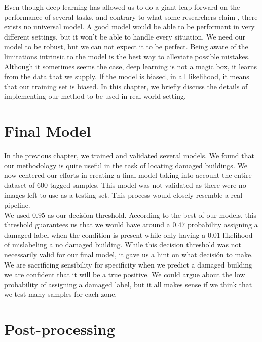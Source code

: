 Even though deep learning has allowed us to do a giant leap forward on the performance of several tasks, and contrary to what some researchers claim \cite{DBLP:journals/corr/KaiserGSVPJU17}, there exists no universal model. A good model would be able to be performant in very different settings, but it won't be able to handle every situation. We need our model to be robust, but we can not expect it to be perfect. Being aware of the limitations intrinsic to the model is the best way to alleviate possible mistakes. Although it sometimes seems the case, deep learning is not a magic box, it learns from the data that we supply. If the model is biased, in all likelihood, it means that our training set is biased. In this chapter, we briefly discuss the details of implementing our method to be used in real-world setting.\\

\section{Final Model}

In the previous chapter, we trained and validated several models. We found that our methodology is quite useful in the task of locating damaged buildings. We now centered our efforts in creating a final model taking into account the entire dataset of 600 tagged samples. This model was not validated as there were no images left to use as a testing set. This process would closely resemble a real pipeline.\\


We used $0.95$ as our decision threshold. According to the best of our models, this threshold guarantees us that we would have around a $0.47$ probability assigning a damaged label when the condition is present while only having a $0.01$ likelihood of mislabeling a no damaged building. While this decision threshold was not necessarily valid for our final model, it gave us a hint on what decisión to make. We are sacrificing sensibility for specificity when we predict a damaged building we are confident that it will be a true positive. We could argue about the low probability of assigning a damaged label, but it all makes sense if we think that we test many samples for each zone.\\


\section{Post-processing}

